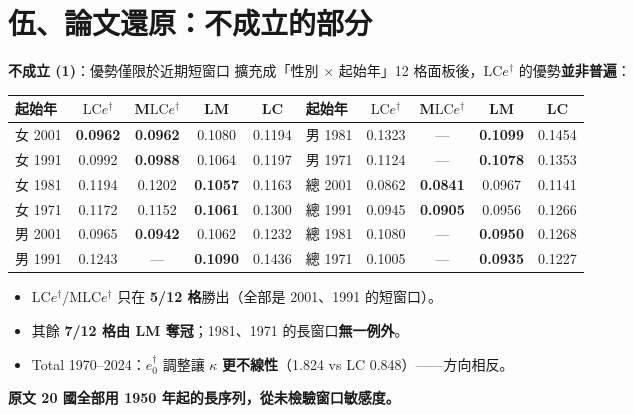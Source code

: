 \documentclass[aspectratio=169, UTF8, fontset=macnew, 11pt]{ctexbeamer}
\newcommand{\edag}{e_0^{\dagger}}
\newcommand{\LCe}{\text{LC}e^{\dagger}}
\newcommand{\hi}[1]{\textcolor{red!70!black}{\textbf{#1}}}
\newcommand{\gd}[1]{\textcolor{green!45!black}{\textbf{#1}}}
\begin{document}
\section{伍、論文還原：不成立的部分}

\begin{frame}{\hi{不成立 (1)}：優勢僅限於近期短窗口}
擴充成「性別 $\times$ 起始年」12 格面板後，$\LCe$ 的優勢\textbf{並非普遍}：
\vspace{4pt}
\begin{center}\scriptsize
\begin{tabular}{lcccc@{\hspace{10pt}}lcccc}
\toprule
起始年 & $\LCe$ & M$\LCe$ & LM & LC & 起始年 & $\LCe$ & M$\LCe$ & LM & LC\\
\midrule
女 2001 & \gd{0.0962} & \gd{0.0962} & 0.1080 & 0.1194 & 男 1981 & 0.1323 & --- & \hi{0.1099} & 0.1454\\
女 1991 & 0.0992 & \gd{0.0988} & 0.1064 & 0.1197 & 男 1971 & 0.1124 & --- & \hi{0.1078} & 0.1353\\
女 1981 & 0.1194 & 0.1202 & \hi{0.1057} & 0.1163 & 總 2001 & 0.0862 & \gd{0.0841} & 0.0967 & 0.1141\\
女 1971 & 0.1172 & 0.1152 & \hi{0.1061} & 0.1300 & 總 1991 & 0.0945 & \gd{0.0905} & 0.0956 & 0.1266\\
男 2001 & 0.0965 & \gd{0.0942} & 0.1062 & 0.1232 & 總 1981 & 0.1080 & --- & \hi{0.0950} & 0.1268\\
男 1991 & 0.1243 & --- & \hi{0.1090} & 0.1436 & 總 1971 & 0.1005 & --- & \hi{0.0935} & 0.1227\\
\bottomrule
\end{tabular}
\end{center}
\vspace{6pt}
\begin{itemize}\small
  \item $\LCe$/M$\LCe$ 只在 \textbf{5/12 格}勝出（全部是 2001、1991 的短窗口）。
  \item 其餘 \textbf{7/12 格由 LM 奪冠}；1981、1971 的長窗口\textbf{無一例外}。
  \item Total 1970--2024：$\edag$ 調整讓 $\kappa$ \hi{更不線性}（1.824 vs LC 0.848）——方向相反。
\end{itemize}
\vspace{2pt}
\footnotesize\textbf{原文 20 國全部用 1950 年起的長序列，從未檢驗窗口敏感度。}
\end{frame}
\end{document}
